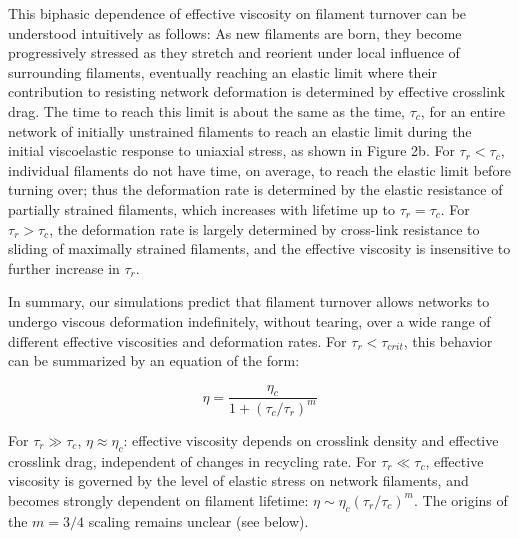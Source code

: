 \documentclass[10pt,letterpaper]{article}
\begin{document}
This biphasic dependence of effective viscosity on filament turnover can be understood intuitively as follows:  As new filaments are born, they become progressively stressed as they stretch and reorient under local influence of surrounding filaments, eventually reaching an elastic limit where their contribution to resisting network deformation is determined by effective crosslink drag.  The time to reach this limit is about the same as the time, $\tau_c$, for an entire network of initially unstrained filaments to reach an elastic limit during the initial viscoelastic response to uniaxial stress, as shown in Figure 2b.  For $\tau_r < \tau_c$, individual filaments do not have time, on average, to reach the elastic limit before turning over; thus the deformation rate is determined by the elastic resistance of partially strained filaments, which increases with lifetime up to $\tau_r = \tau_c$. For $\tau_r > \tau_c$, the deformation rate is largely determined by cross-link resistance to sliding of maximally strained filaments, and the effective viscosity is insensitive to further increase in  $\tau_r$.

In summary, our simulations predict that filament turnover allows networks to undergo viscous deformation indefinitely, without tearing, over a wide range of different effective viscosities and deformation rates. For $\tau_r < \tau_{crit}$, this behavior can be summarized by an equation of the form:

\begin{equation}
\label{eqn:simple_eta}
\eta = \frac{\eta_c}{1+(\tau_c/\tau_r)^m}  
\end{equation}

For $\tau_r \gg \tau_c$, $\eta\approx\eta_c$: effective viscosity depends on crosslink density and effective crosslink drag, independent of changes in recycling rate. For $\tau_r\ll\tau_c$,  effective viscosity is governed by the level of elastic stress on network filaments, and becomes strongly dependent on filament lifetime: $\eta\sim\eta_c(\tau_r/\tau_c)^m$. The origins of the $m = 3/4$ scaling remains unclear (see below).
\end{document}
